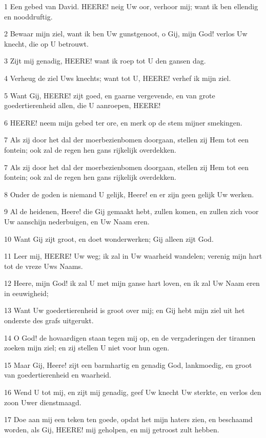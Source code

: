 \par 1 Een gebed van David. HEERE! neig Uw oor, verhoor mij; want ik ben ellendig en nooddruftig.
\par 2 Bewaar mijn ziel, want ik ben Uw gunstgenoot, o Gij, mijn God! verlos Uw knecht, die op U betrouwt.
\par 3 Zijt mij genadig, HEERE! want ik roep tot U den gansen dag.
\par 4 Verheug de ziel Uws knechts; want tot U, HEERE! verhef ik mijn ziel.
\par 5 Want Gij, HEERE! zijt goed, en gaarne vergevende, en van grote goedertierenheid allen, die U aanroepen, HEERE!
\par 6 HEERE! neem mijn gebed ter ore, en merk op de stem mijner smekingen.
\par 7 Als zij door het dal der moerbezienbomen doorgaan, stellen zij Hem tot een fontein; ook zal de regen hen gans rijkelijk overdekken.
\par 7 Als zij door het dal der moerbezienbomen doorgaan, stellen zij Hem tot een fontein; ook zal de regen hen gans rijkelijk overdekken.
\par 8 Onder de goden is niemand U gelijk, Heere! en er zijn geen gelijk Uw werken.
\par 9 Al de heidenen, Heere! die Gij gemaakt hebt, zullen komen, en zullen zich voor Uw aanschijn nederbuigen, en Uw Naam eren.
\par 10 Want Gij zijt groot, en doet wonderwerken; Gij alleen zijt God.
\par 11 Leer mij, HEERE! Uw weg; ik zal in Uw waarheid wandelen; verenig mijn hart tot de vreze Uws Naams.
\par 12 Heere, mijn God! ik zal U met mijn ganse hart loven, en ik zal Uw Naam eren in eeuwigheid;
\par 13 Want Uw goedertierenheid is groot over mij; en Gij hebt mijn ziel uit het onderste des grafs uitgerukt.
\par 14 O God! de hovaardigen staan tegen mij op, en de vergaderingen der tirannen zoeken mijn ziel; en zij stellen U niet voor hun ogen.
\par 15 Maar Gij, Heere! zijt een barmhartig en genadig God, lankmoedig, en groot van goedertierenheid en waarheid.
\par 16 Wend U tot mij, en zijt mij genadig, geef Uw knecht Uw sterkte, en verlos den zoon Uwer dienstmaagd.
\par 17 Doe aan mij een teken ten goede, opdat het mijn haters zien, en beschaamd worden, als Gij, HEERE! mij geholpen, en mij getroost zult hebben.

